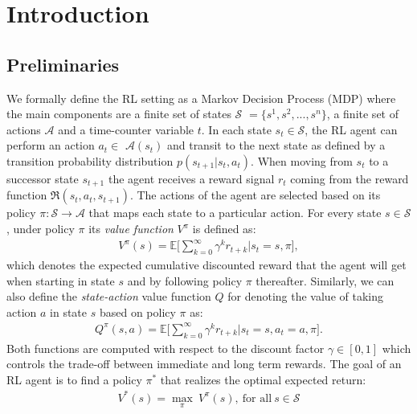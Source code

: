 
\chapter{Introduction} %

\label{ch:introduction} %

\section{Preliminaries}
We formally define the RL setting as a Markov Decision Process (MDP) where the main components are a finite set of states $\mathcal{S}$ $=\{s^{1}, s^{2},...,s^{n}\}$, a finite set of actions $\mathcal{A}$ and a time-counter variable $t$. In each state $s_{t}\in \mathcal{S}$, the RL agent can perform an action $a_{t} \in$ $\mathcal{A}(s_t)$ and transit to the next state as defined by a transition probability distribution $p(s_{t+1} | s_{t}, a_{t})$.
 When moving from $s_t$ to a successor state $s_{t+1}$ the agent receives a reward signal $r_t$ coming from the reward function $\Re (s_{t}, a_{t}, s_{t+1})$. The actions of the agent are selected based on its policy $\pi:\mathcal{S} \rightarrow \mathcal{A}$ that maps each state to a particular action. For every state $s \in \mathcal{S}$, under policy $\pi$ its \textit{value function} $V^{\pi}$ is defined as:
\begin{align}
    V^{\pi}(s)=\mathds{E}\bigg[\sum_{k=0}^{\infty}\gamma^{k}r_{t+k}\bigg| s_t = s, \pi \bigg],
\end{align}
which denotes the expected cumulative discounted reward that the agent will get when starting in state $s$ and by following policy $\pi$ thereafter. Similarly, we can also define the \textit{state-action} value function $Q$ for denoting the value of taking action $a$ in state $s$ based on policy $\pi$ as:
\begin{align}
    Q^{\pi}(s,a)=\mathds{E}\bigg[\sum_{k=0}^{\infty}\gamma^{k}r_{t+k} \bigg| s_t = s, a_t=a, \pi\bigg].
\end{align}
Both functions are computed with respect to the discount factor $\gamma \in [0,1]$ which controls the trade-off between immediate and long term rewards. The goal of an RL agent is to find a policy $\pi^{*}$ that realizes the optimal expected return:
\begin{align}
 V^{*}(s)=\underset{\pi}{\max}\:V^{\pi}(s), \ \text{for all} \ s\in\mathcal{S}
\end{align}
